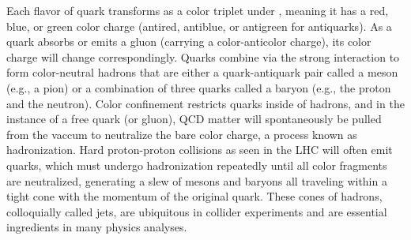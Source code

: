 Each flavor of quark transforms as a color triplet under \SUthreeC, meaning it has a red, blue, or green color charge (antired, antiblue, or antigreen for antiquarks). As a quark absorbs or emits a gluon (carrying a color-anticolor charge), its color charge will change correspondingly. Quarks combine via the strong interaction to form color-neutral hadrons that are either a quark-antiquark pair called a meson (e.g., a pion) or a combination of three quarks called a baryon (e.g., the proton and the neutron). Color confinement restricts quarks inside of hadrons, and in the instance of a free quark (or gluon), QCD matter will spontaneously be pulled from the vaccum to neutralize the bare color charge, a process known as hadronization. Hard proton-proton collisions as seen in the LHC will often emit quarks, which must undergo hadronization repeatedly until all color fragments are neutralized, generating a slew of mesons and baryons all traveling within a tight cone with the momentum of the original quark. These cones of hadrons, colloquially called jets, are ubiquitous in collider experiments and are essential ingredients in many physics analyses. 
